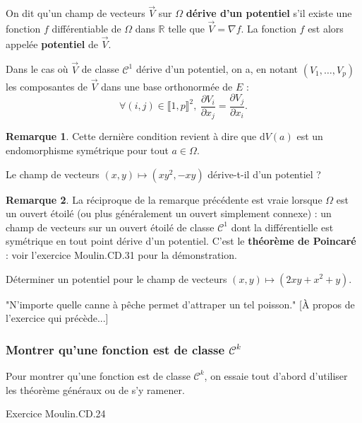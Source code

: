 \documentclass[french]{article}
\newcommand{\R}{\mathbb{R}}
\renewcommand{\d}{\text{d}}
\theoremstyle{plain}
\theoremstyle{definition}
\newtheorem*{rmq}{Remarque}
\theoremstyle{remark}
\begin{document}
On dit qu'un champ de vecteurs $\overrightarrow{V}$ sur $\Omega$ \textbf{dérive d'un potentiel} s'il existe une fonction $f$ différentiable de $\Omega$ dans $\R$ telle que $\overrightarrow{V}=\nabla f$. La fonction $f$ est alors appelée \textbf{potentiel} de $\overrightarrow{V}$.

Dans le cas où $\overrightarrow{V}$ de classe $\mathcal{C}^1$ dérive d'un potentiel, on a, en notant $(V_1,\ldots,V_p)$ les composantes de $\overrightarrow{V}$ dans une base orthonormée de $E$ :
$$\forall (i,j)\in\llbracket1,p\rrbracket^2,\ \frac{\partial V_i}{\partial x_j}=\frac{\partial V_j}{\partial x_i}.$$

\begin{rmq}
	Cette dernière condition revient à dire que $\d V(a)$ est un endomorphisme symétrique pour tout $a\in\Omega$.
\end{rmq}

\begin{exo}
	Le champ de vecteurs $(x,y)\mapsto (xy^2,-xy)$ dérive-t-il d'un potentiel ?
\end{exo}

\begin{rmq}
	La réciproque de la remarque précédente est vraie lorsque $\Omega$ est un ouvert étoilé (ou plus généralement un ouvert simplement connexe) : un champ de vecteurs sur un ouvert étoilé de classe $\mathcal{C}^1$ dont la différentielle est symétrique en tout point dérive d'un potentiel. C'est le \textbf{théorème de Poincaré} : voir l'exercice Moulin.CD.31 pour la démonstration.
\end{rmq}

\begin{exo}
	Déterminer un potentiel pour le champ de vecteurs $(x,y)\mapsto (2xy+x^2+y)$.
\end{exo}

"N'importe quelle canne à pêche permet d'attraper un tel poisson." [À propos de l'exercice qui précède...]

\subsubsection*{Montrer qu'une fonction est de classe $\mathcal{C}^k$}

\begin{met}
	Pour montrer qu'une fonction est de classe $\mathcal{C}^k$, on essaie tout d'abord d'utiliser les théorème généraux ou de s'y ramener.
\end{met}

Exercice Moulin.CD.24
\end{document}
